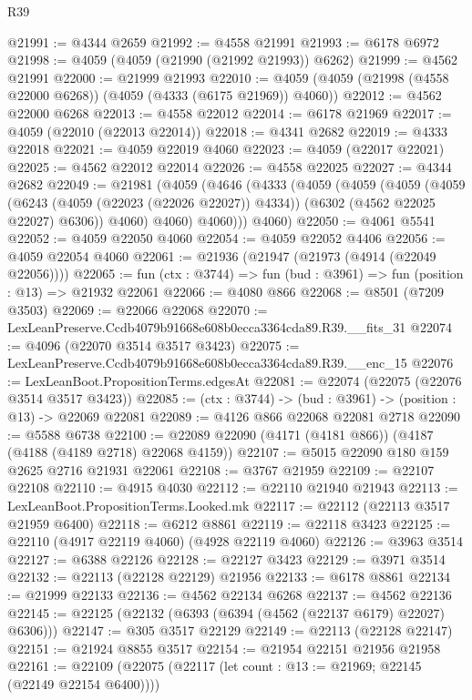 \begin{lexlean}{R39}
\begin{coremodule}
@21991 := @4344 @2659
@21992 := @4558 @21991
@21993 := @6178 @6972
@21998 := @4059 (@4059 (@21990 (@21992 @21993)) @6262)
@21999 := @4562 @21991
@22000 := @21999 @21993
@22010 := @4059 (@4059 (@21998 (@4558 @22000 @6268)) (@4059 (@4333 (@6175 @21969)) @4060))
@22012 := @4562 @22000 @6268
@22013 := @4558 @22012
@22014 := @6178 @21969
@22017 := @4059 (@22010 (@22013 @22014))
@22018 := @4341 @2682
@22019 := @4333 @22018
@22021 := @4059 @22019 @4060
@22023 := @4059 (@22017 @22021)
@22025 := @4562 @22012 @22014
@22026 := @4558 @22025
@22027 := @4344 @2682
@22049 := @21981
    (@4059
      (@4646
        (@4333
          (@4059
            (@4059
              (@4059
                (@4059
                  (@6243 (@4059 (@22023 (@22026 @22027)) @4334))
                  (@6302 (@4562 @22025 @22027) @6306))
                @4060)
              @4060)
            @4060)))
      @4060)
@22050 := @4061 @5541
@22052 := @4059 @22050 @4060
@22054 := @4059 @22052 @4406
@22056 := @4059 @22054 @4060
@22061 := @21936 (@21947 (@21973 (@4914 (@22049 @22056))))
@22065 := fun (ctx : @3744) => fun (bud : @3961) => fun (position : @13) => @21932 @22061
@22066 := @4080 @866
@22068 := @8501 (@7209 @3503)
@22069 := @22066 @22068
@22070 := LexLeanPreserve.Ccdb4079b91668e608b0ecca3364cda89.R39.__fits_31
@22074 := @4096 (@22070 @3514 @3517 @3423)
@22075 := LexLeanPreserve.Ccdb4079b91668e608b0ecca3364cda89.R39.__enc_15
@22076 := LexLeanBoot.PropositionTerms.edgesAt
@22081 := @22074 (@22075 (@22076 @3514 @3517 @3423))
@22085 := (ctx : @3744) -> (bud : @3961) -> (position : @13) -> @22069 @22081
@22089 := @4126 @866 @22068 @22081 @2718
@22090 := @5588 @6738
@22100 := @22089 @22090 (@4171 (@4181 @866)) (@4187 (@4188 (@4189 @2718) @22068 @4159))
@22107 := @5015 @22090 @180 @159 @2625 @2716 @21931 @22061
@22108 := @3767 @21959
@22109 := @22107 @22108
@22110 := @4915 @4030
@22112 := @22110 @21940 @21943
@22113 := LexLeanBoot.PropositionTerms.Looked.mk
@22117 := @22112 (@22113 @3517 @21959 @6400)
@22118 := @6212 @8861
@22119 := @22118 @3423
@22125 := @22110 (@4917 @22119 @4060) (@4928 @22119 @4060)
@22126 := @3963 @3514
@22127 := @6388 @22126
@22128 := @22127 @3423
@22129 := @3971 @3514
@22132 := @22113 (@22128 @22129) @21956
@22133 := @6178 @8861
@22134 := @21999 @22133
@22136 := @4562 @22134 @6268
@22137 := @4562 @22136
@22145 := @22125 (@22132 (@6393 (@6394 (@4562 (@22137 @6179) @22027) @6306)))
@22147 := @305 @3517 @22129
@22149 := @22113 (@22128 @22147)
@22151 := @21924 @8855 @3517
@22154 := @21954 @22151 @21956 @21958
@22161 := @22109 (@22075 (@22117 (let count : @13 := @21969; @22145 (@22149 @22154 @6400))))

\end{coremodule}
\end{lexlean}
